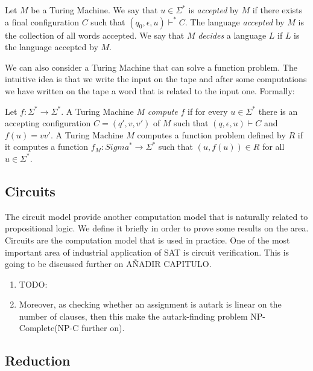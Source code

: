   \begin{definition}
     Let $M$ be a Turing Machine. We say that $u\in\Sigma^*$ is \emph{accepted} by $M$ if there exists a final configuration $C$ such that $(q_0,\epsilon,u)\vdash^* C$. The language \emph{accepted} by $M$ is the collection of all words accepted. We say that $M$ \emph{decides} a language $L$ if $L$ is the language accepted by $M$.
  \end{definition}

  We can also consider a Turing Machine that can solve a function problem. The intuitive idea is that we write the input on the tape and after some computations we have written on the tape a word that is related to the input one. Formally:


  \begin{definition}
    Let $f:\Sigma^*\to \Sigma^*$. A Turing Machine $M$ \emph{compute} $f$ if for every $u\in \Sigma^*$ there is an accepting configuration $C=(q',v,v')$ of $M$  such that $(q,\epsilon,u)\vdash C$ and $f(u)=vv'$. A Turing Machine $M$ computes a function problem defined by $R$ if it computes a function $f_M:Sigma^*\to \Sigma^*$ such that $(u,f(u)) \in R$ for all $ u\in \Sigma^*$.
  \end{definition}

  
\subsection{Circuits}

The circuit model provide another computation model that is naturally related to propositional logic. We define it briefly in order to prove some results on the area. Circuits are the computation model that is used in practice. One of the most important area of industrial application of SAT is circuit verification. This is going to be discussed further on AÑADIR CAPITULO.

\begin{enumerate}
  \item TODO:
\item Moreover, as checking whether an assignment is autark is linear on the number of clauses, then this make the autark-finding problem NP-Complete(NP-C further on).
\end{enumerate}

\subsection{Reduction}

